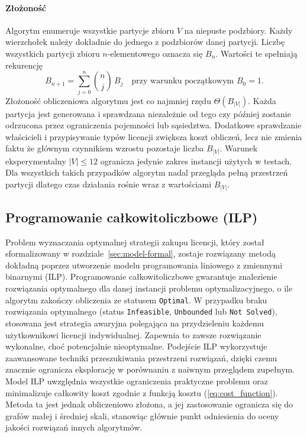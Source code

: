 \paragraph{Złożoność}
Algorytm enumeruje wszystkie partycje zbioru \(V\) na niepuste podzbiory. Każdy wierzchołek należy dokładnie do jednego z podzbiorów danej partycji. Liczbę wszystkich partycji zbioru \(n\)-elementowego oznacza się \(B_n\). Wartości te spełniają rekurencję
\[
B_{n+1}=\sum_{j=0}^{n} \binom{n}{j}\,B_j \quad \text{przy warunku początkowym } B_0=1.
\]
Złożoność obliczeniowa algorytmu jest co najmniej rzędu \(\Theta(B_{|V|})\). Każda partycja jest generowana i sprawdzana niezależnie od tego czy później zostanie odrzucona przez ograniczenia pojemności lub sąsiedztwa. Dodatkowe sprawdzanie właścicieli i przypisywanie typów licencji zwiększa koszt obliczeń, lecz nie zmienia faktu że głównym czynnikiem wzrostu pozostaje liczba \(B_{|V|}\). Warunek eksperymentalny \(|V|\le 12\) ogranicza jedynie zakres instancji użytych w testach. Dla wszystkich takich przypadków algorytm nadal przegląda pełną przestrzeń partycji dlatego czas działania rośnie wraz z wartościami \(B_{|V|}\).

\subsection{Programowanie całkowitoliczbowe (ILP)}\label{subsec:ilp}

Problem wyznaczania optymalnej strategii zakupu licencji, który został sformalizowany w rozdziale~\ref{sec:model-formal}, zostaje rozwiązany metodą dokładną poprzez utworzenie modelu programowania liniowego z zmiennymi binarnymi (ILP).
Programowanie całkowitoliczbowe gwarantuje znalezienie rozwiązania optymalnego dla danej instancji problemu optymalizacyjnego, o ile algorytm zakończy obliczenia ze statusem \texttt{Optimal}.
W przypadku braku rozwiązania optymalnego (status \texttt{Infeasible}, \texttt{Unbounded} lub \texttt{Not Solved}), stosowana jest strategia awaryjna polegająca na przydzieleniu każdemu użytkownikowi licencji indywidualnej. Zapewnia to zawsze rozwiązanie wykonalne, choć potencjalnie nieoptymalne.
Podejście ILP wykorzystuje zaawansowane techniki przeszukiwania przestrzeni rozwiązań, dzięki czemu znacznie ogranicza eksplorację w porównaniu z naiwnym przeglądem zupełnym.
Model ILP uwzględnia wszystkie ograniczenia praktyczne problemu oraz minimalizuje całkowity koszt zgodnie z funkcją kosztu (\ref{eq:cost_function}).
Metoda ta jest jednak obliczeniowo złożona, a jej zastosowanie ogranicza się do grafów małej i średniej skali, stanowiąc głównie punkt odniesienia do oceny jakości rozwiązań innych algorytmów.

